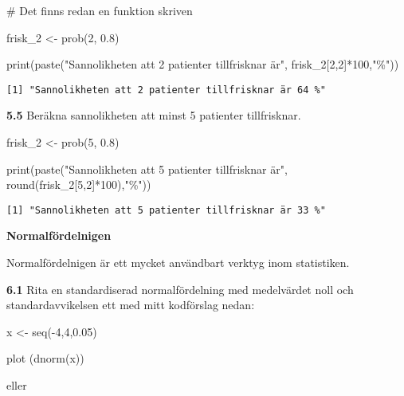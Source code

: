 \documentclass[
  letterpaper,
  DIV=11,
  numbers=noendperiod]{scrartcl}
\newenvironment{Shaded}{\begin{snugshade}}{\end{snugshade}}
\newcommand{\CommentTok}[1]{\textcolor[rgb]{0.37,0.37,0.37}{#1}}
\newcommand{\DecValTok}[1]{\textcolor[rgb]{0.68,0.00,0.00}{#1}}
\newcommand{\FloatTok}[1]{\textcolor[rgb]{0.68,0.00,0.00}{#1}}
\newcommand{\FunctionTok}[1]{\textcolor[rgb]{0.28,0.35,0.67}{#1}}
\newcommand{\NormalTok}[1]{\textcolor[rgb]{0.00,0.23,0.31}{#1}}
\newcommand{\OtherTok}[1]{\textcolor[rgb]{0.00,0.23,0.31}{#1}}
\newcommand{\SpecialCharTok}[1]{\textcolor[rgb]{0.37,0.37,0.37}{#1}}
\newcommand{\StringTok}[1]{\textcolor[rgb]{0.13,0.47,0.30}{#1}}
\begin{document}
\begin{Shaded}
\begin{Highlighting}[]
\CommentTok{\# Det finns redan en funktion skriven}

\NormalTok{frisk\_2 }\OtherTok{\textless{}{-}} \FunctionTok{prob}\NormalTok{(}\DecValTok{2}\NormalTok{, }\FloatTok{0.8}\NormalTok{)}

\FunctionTok{print}\NormalTok{(}\FunctionTok{paste}\NormalTok{(}\StringTok{"Sannolikheten att 2 patienter tillfrisknar är"}\NormalTok{, frisk\_2[}\DecValTok{2}\NormalTok{,}\DecValTok{2}\NormalTok{]}\SpecialCharTok{*}\DecValTok{100}\NormalTok{,}\StringTok{"\%"}\NormalTok{))}
\end{Highlighting}
\end{Shaded}

\begin{verbatim}
[1] "Sannolikheten att 2 patienter tillfrisknar är 64 %"
\end{verbatim}

\textbf{5.5} Beräkna sannolikheten att minst 5 patienter tillfrisknar.

\begin{Shaded}
\begin{Highlighting}[]
\NormalTok{frisk\_2 }\OtherTok{\textless{}{-}} \FunctionTok{prob}\NormalTok{(}\DecValTok{5}\NormalTok{, }\FloatTok{0.8}\NormalTok{)}

\FunctionTok{print}\NormalTok{(}\FunctionTok{paste}\NormalTok{(}\StringTok{"Sannolikheten att 5 patienter tillfrisknar är"}\NormalTok{, }\FunctionTok{round}\NormalTok{(frisk\_2[}\DecValTok{5}\NormalTok{,}\DecValTok{2}\NormalTok{]}\SpecialCharTok{*}\DecValTok{100}\NormalTok{),}\StringTok{"\%"}\NormalTok{))}
\end{Highlighting}
\end{Shaded}

\begin{verbatim}
[1] "Sannolikheten att 5 patienter tillfrisknar är 33 %"
\end{verbatim}

\textbf{Normalfördelnigen}

Normalfördelnigen är ett mycket användbart verktyg inom statistiken.

\textbf{6.1} Rita en standardiserad normalfördelning med medelvärdet
noll och standardavvikelsen ett med mitt kodförslag nedan:

x \textless- seq(-4,4,0.05)

plot (dnorm(x))

eller
\end{document}
